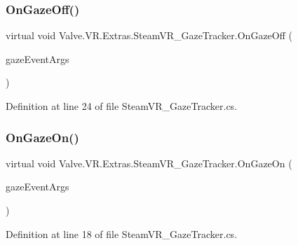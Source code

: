 \subsubsection{\texorpdfstring{OnGazeOff()}{OnGazeOff()}}
{\footnotesize\ttfamily virtual void Valve.\+V\+R.\+Extras.\+Steam\+V\+R\+\_\+\+Gaze\+Tracker.\+On\+Gaze\+Off (\begin{DoxyParamCaption}\item[{\mbox{\hyperlink{struct_valve_1_1_v_r_1_1_extras_1_1_gaze_event_args}{Gaze\+Event\+Args}}}]{gaze\+Event\+Args }\end{DoxyParamCaption})\hspace{0.3cm}{\ttfamily [virtual]}}



Definition at line 24 of file Steam\+V\+R\+\_\+\+Gaze\+Tracker.\+cs.

\mbox{\label{class_valve_1_1_v_r_1_1_extras_1_1_steam_v_r___gaze_tracker_a7e6346dc415e1331a705d0c648ae3545}} 
\subsubsection{\texorpdfstring{OnGazeOn()}{OnGazeOn()}}
{\footnotesize\ttfamily virtual void Valve.\+V\+R.\+Extras.\+Steam\+V\+R\+\_\+\+Gaze\+Tracker.\+On\+Gaze\+On (\begin{DoxyParamCaption}\item[{\mbox{\hyperlink{struct_valve_1_1_v_r_1_1_extras_1_1_gaze_event_args}{Gaze\+Event\+Args}}}]{gaze\+Event\+Args }\end{DoxyParamCaption})\hspace{0.3cm}{\ttfamily [virtual]}}



Definition at line 18 of file Steam\+V\+R\+\_\+\+Gaze\+Tracker.\+cs.

\mbox{\label{class_valve_1_1_v_r_1_1_extras_1_1_steam_v_r___gaze_tracker_a2aec55ddcc6a0955dbe56c67de31beb0}} 
